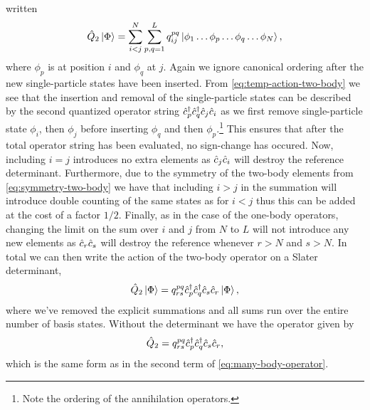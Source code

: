         written
        \begin{align}
            \hat{Q}_2\ket*{\Phi}
            = \sum_{i < j}^{N}\sum_{p, q = 1}^{L}
            q^{pq}_{ij}\ket*{\phi_1\dots\phi_p\dots\phi_q\dots\phi_N},
            \label{eq:temp-action-two-body}
        \end{align}
        where $\phi_p$ is at position $i$ and $\phi_q$ at $j$.
        Again we ignore canonical ordering after the new single-particle states
        have been inserted.
        From \autoref{eq:temp-action-two-body} we see that the insertion and
        removal of the single-particle states can be described by the second
        quantized operator string $\hat{c}_{p}^{\dagger}\hat{c}_{q}^{\dagger}\hat{c}_{j}\hat{c}_{i}$ as we first
        remove single-particle state $\phi_i$, then $\phi_j$ before inserting
        $\phi_q$ and then $\phi_p$.\footnote{%
            Note the ordering of the annihilation operators.
        }
        This ensures that after the total operator string has been evaluated, no
        sign-change has occured.
        Now, including $i = j$ introduces no extra elements as $\hat{c}_{j}\hat{c}_{i}$
        will destroy the reference determinant.
        Furthermore, due to the symmetry of the two-body elements from
        \autoref{eq:symmetry-two-body} we have that including $i > j$ in the
        summation will introduce double counting of the same states as for $i <
        j$ thus this can be added at the cost of a factor $1/2$.
        Finally, as in the case of the one-body operators, changing the limit on
        the sum over $i$ and $j$ from $N$ to $L$ will not introduce any new
        elements as $\hat{c}_{r}\hat{c}_{s}$ will destroy the reference whenever $r > N$
        and $s > N$.
        In total we can then write the action of the two-body operator on a
        Slater determinant,
        \begin{align}
            \hat{Q}_2\ket*{\Phi}
            = q^{pq}_{rs} \hat{c}_{p}^{\dagger}\hat{c}_{q}^{\dagger}\hat{c}_{s}\hat{c}_{r}\ket*{\Phi},
        \end{align}
        where we've removed the explicit summations and all sums run over the
        entire number of basis states.
        Without the determinant we have the operator given by
        \begin{align}
            \hat{Q}_2
            = q^{pq}_{rs}\hat{c}_{p}^{\dagger}\hat{c}_{q}^{\dagger}\hat{c}_{s}\hat{c}_{r},
        \end{align}
        which is the same form as in the second term of
        \autoref{eq:many-body-operator}.

